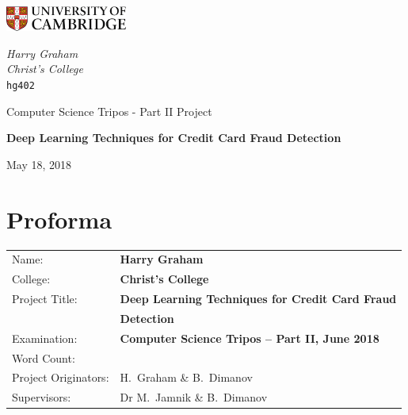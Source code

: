 \documentclass[12pt,a4paper,twoside]{report}
\begin{document}
\begin{titlepage}
	\noindent
	\begin{minipage}[t][][t]{0.5\textwidth}
		\includegraphics[width=40mm]{CamLogo.jpg}
	\end{minipage}
	\begin{minipage}{0.5\textwidth}
	\begin{flushright}
		\large
		\textit{Harry Graham}
		\\
		\textit{Christ's College}
		\\
		\texttt{hg402}
	\end{flushright}
	\end{minipage}
	
	\begin{center}
	\vspace{6cm}
	{\sc\large Computer Science Tripos - Part II Project\par}
	\vspace{0.5cm}
	{\huge\bf Deep Learning Techniques for Credit Card Fraud Detection\par}
	\vspace{0.5cm}
	{\large May 18, 2018 \par}
	\end{center}

\end{titlepage}

\pagestyle{plain}

\section*{\huge Proforma}
\vspace{0.5cm}
{\large
\begin{tabular}{ll}
Name:               & \bf Harry Graham \\
College:            & \bf Christ's College \\
Project Title:      & \bf Deep Learning Techniques for Credit Card Fraud \\
			 & \bf Detection \\
Examination:        & \bf Computer Science Tripos -- Part II, June 2018 \\
Word Count:         &  \\
Project Originators: & H.~Graham \& B.~Dimanov \\
Supervisors:         & Dr M.~Jamnik \& B.~Dimanov 
\end{tabular}
}
\end{document}
